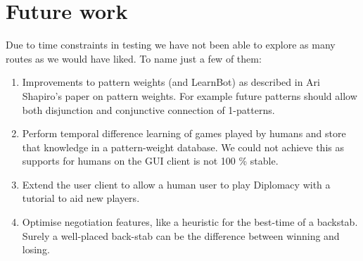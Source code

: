 \documentclass[pdftex,11pt,a4paper]{report}
\begin{document}
\section{Future work}

Due to time constraints in testing we have not been able to explore as
many routes as we would have liked. To name just a few of them: 
\\
\begin{enumerate}

\item Improvements to pattern weights (and LearnBot) as described in
  Ari Shapiro's paper on pattern weights. For example future patterns
  should allow both disjunction and conjunctive connection of 1-patterns.

\item Perform temporal difference learning of games played by humans
  and store that knowledge in a pattern-weight database. We could not
  achieve this as supports for humans on the GUI client is not 100 \% stable.

\item Extend the user client to allow a human user to play Diplomacy
  with a tutorial to aid new players.

\item Optimise negotiation features, like a heuristic for the best-time
  of a backstab. Surely a well-placed back-stab can be the difference between
  winning and losing.

\end{enumerate}




\end{document}
